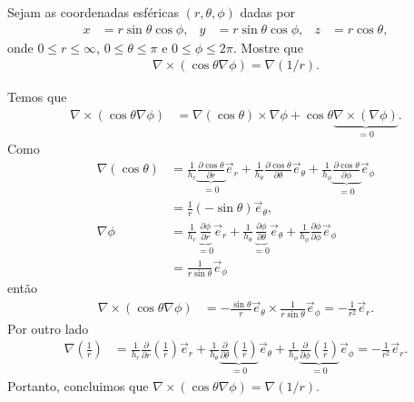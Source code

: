 \documentclass[a4paper,12pt, leqno, answers]{exam}
\newcommand{\devp}[2]{\frac{\partial #1}{\partial #2}}
\begin{document}
\begin{questions}
    \question[P1 de 2012] Sejam as coordenadas esf\'{e}ricas $(r, \theta, \phi)$ dadas por
    \begin{align*}
        x &= r \sin \theta \cos \phi, & y &= r \sin \theta \cos \phi, & z &= r \cos \theta,
    \end{align*}
    onde $0 \leq r \leq \infty$, $0 \leq \theta \leq \pi$ e $0 \leq \phi \leq 2 \pi$. Mostre que
    \begin{align*}
        \nabla \times (\cos \theta \nabla \phi) = \nabla (1/r).
    \end{align*}
    \begin{solution}
        Temos que
        \begin{align*}
            \nabla \times (\cos \theta \nabla \phi) &= \nabla(\cos \theta) \times \nabla \phi + \cos \theta \underbrace{\nabla \times (\nabla \phi)}_{= 0}.
        \end{align*}
        Como
        \begin{align*}
            \nabla(\cos \theta) &= \frac{1}{h_r} \underbrace{\devp{\cos \theta}{r}}_{= 0} \vec{e}_r + \frac{1}{h_\theta} \devp{\cos \theta}{\theta} \vec{e}_\theta + \frac{1}{h_\phi} \underbrace{\devp{\cos \theta}{\phi}}_{= 0} \vec{e}_\phi \\
            &= \frac{1}{r} (- \sin \theta) \vec{e}_\theta, \\
            \nabla \phi &= \frac{1}{h_r} \underbrace{\devp{\phi}{r}}_{= 0} \vec{e}_r + \frac{1}{h_\theta} \underbrace{\devp{\phi}{\theta}}_{= 0} \vec{e}_\theta + \frac{1}{h_\phi} \devp{\phi}{\phi} \vec{e}_\phi \\
            &= \frac{1}{r \sin \theta} \vec{e}_\phi
        \end{align*}
        ent\~{a}o
        \begin{align*}
            \nabla \times (\cos \theta \nabla \phi) &= - \frac{\sin \theta}{r} \vec{e}_\theta \times \frac{1}{r \sin \theta} \vec{e}_\phi = - \frac{1}{r^2} \vec{e}_r.
        \end{align*}
        Por outro lado
        \begin{align*}
            \nabla\left( \frac{1}{r} \right) &= \frac{1}{h_r} \devp{}{r} \left( \frac{1}{r} \right) \vec{e}_r + \frac{1}{h_\theta} \underbrace{\devp{}{\theta} \left( \frac{1}{r} \right)}_{= 0} \vec{e}_\theta + \frac{1}{h_\phi} \underbrace{\devp{}{\phi} \left( \frac{1}{r} \right)}_{= 0} \vec{e}_\phi = - \frac{1}{r^2} \vec{e}_r.
        \end{align*}
        Portanto, concluimos que $\nabla \times (\cos \theta \nabla \phi) = \nabla(1/r)$.
    \end{solution}
\end{questions}
\end{document}
